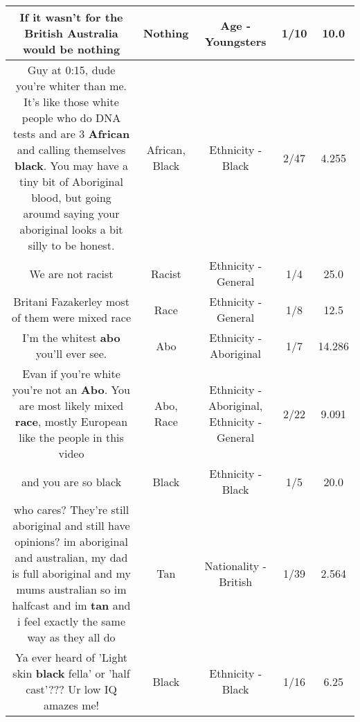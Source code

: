 \documentclass[11pt]{article}
\newlength\mylength
\begin{document}
\begin{center}
\begin{longtable}{|C{.65\mylength}|C{.30\mylength}|C{.12\mylength}|C{.12\mylength}|C{.12\mylength}|}
  \small If it wasn't for the British Australia would be nothing\normalsize   & Nothing & Age - Youngsters & 1/10 & 10.0 \\  \hline
  \small Guy at 0:15, dude you're whiter than me. It's like those white people who do DNA tests and are 3 \textbf{African} and calling themselves \textbf{black}. You may have a tiny bit of Aboriginal blood, but going aroumd saying your aboriginal looks a bit silly to be honest.\normalsize   & African, Black & Ethnicity - Black & 2/47 & 4.255 \\  \hline
  \small We are not racist\normalsize   & Racist & Ethnicity - General & 1/4 & 25.0 \\  \hline
  \small Britani Fazakerley most of them were mixed race\normalsize   & Race & Ethnicity - General & 1/8 & 12.5 \\  \hline
  \small I'm the whitest \textbf{abo} you'll ever see.\normalsize   & Abo & Ethnicity - Aboriginal & 1/7 & 14.286 \\  \hline
  \small Evan if you're white you're not an \textbf{Abo}.  You are most likely mixed \textbf{race}, mostly European like the people in this video\normalsize   & Abo, Race & Ethnicity - Aboriginal, Ethnicity - General & 2/22 & 9.091 \\  \hline
  \small and you are so black\normalsize   & Black & Ethnicity - Black & 1/5 & 20.0 \\  \hline
  \small who cares? They're still aboriginal and still have opinions? im aboriginal and australian, my dad is full aboriginal and my mums australian so im halfcast and im \textbf{tan} and i feel exactly the same way as they all do\normalsize   & Tan & Nationality - British & 1/39 & 2.564 \\  \hline
  \small Ya ever heard of 'Light skin \textbf{black} fella' or 'half cast'??? Ur low IQ amazes me!\normalsize   & Black & Ethnicity - Black & 1/16 & 6.25 \\  \hline

\end{longtable}
\end{center}
\end{document}
